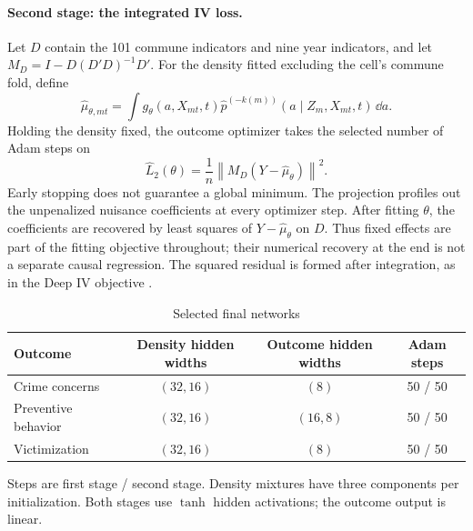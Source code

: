 \documentclass{article}
\begin{document}
\paragraph{Second stage: the integrated IV loss.}
Let $D$ contain the 101 commune indicators and nine year indicators, and let $M_D=I-D(D'D)^{-1}D'$. For the density fitted excluding the cell's commune fold, define
\begin{equation}
\widehat\mu_{\theta,mt}
=\int g_\theta(a,X_{mt},t)\widehat p^{(-k(m))}(a\mid Z_m,X_{mt},t)\,\dd a.
\end{equation}
Holding the density fixed, the outcome optimizer takes the selected number of Adam steps on
\begin{equation}
\widehat L_2(\theta)=\frac1n
\left\|M_D(Y-\widehat\mu_\theta)\right\|^2.
\label{eq:neural-loss}
\end{equation}
Early stopping does not guarantee a global minimum. The projection profiles out the unpenalized nuisance coefficients at every optimizer step. After fitting $\theta$, the coefficients are recovered by least squares of $Y-\widehat\mu_\theta$ on $D$. Thus fixed effects are part of the fitting objective throughout; their numerical recovery at the end is not a separate causal regression. The squared residual is formed after integration, as in the Deep IV objective \cite[eqs. (6)--(7)]{deepiv}.

\begin{table}[H]
\centering
\caption{Selected final networks}
\label{tab:neural-settings}
\small
\begin{tabularx}{\linewidth}{@{}Xccc@{}}
\toprule
Outcome & Density hidden widths & Outcome hidden widths & Adam steps\\
\midrule
Crime concerns & $(32,16)$ & $(8)$ & 50 / 50\\
Preventive behavior & $(32,16)$ & $(16,8)$ & 50 / 50\\
Victimization & $(32,16)$ & $(8)$ & 50 / 50\\
\bottomrule
\end{tabularx}
\smallskip
\parbox{\linewidth}{\footnotesize Steps are first stage / second stage. Density mixtures have three components per initialization. Both stages use $\tanh$ hidden activations; the outcome output is linear.}
\end{table}
\end{document}
